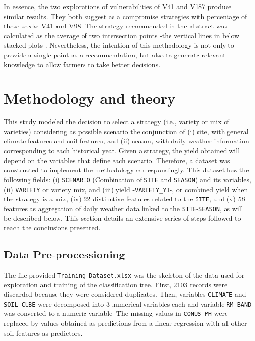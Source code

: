 \documentclass[syngen,nonblindrev]{informs3-syngen}
\begin{document}
In essence, the two explorations of vulnerabilities of V41 and V187 produce similar results. 
They both suggest as a compromise strategies with percentage of these seeds: V41 and V98. 
The strategy recommended in the abstract was calculated as the average of two intersection points -the vertical lines in below stacked plots-. 
Nevertheless, the intention of this methodology is not only to provide a single point as a recommendation, but also to generate relevant knowledge to allow farmers to take better decisions.

\section{Methodology and theory}

This study modeled the decision to select a strategy (i.e., variety or mix of varieties) considering as possible scenario the conjunction of (i) site, with general climate features and soil features, and (ii) season, with daily weather information corresponding to each historical year. 
Given a strategy, the yield obtained will depend on the variables that define each scenario. 
Therefore, a dataset was constructed to implement the methodology correspondingly.
This dataset has the following fields: (i) \texttt{SCENARIO} (Combination of \texttt{SITE} and \texttt{SEASON}) and its variables, (ii) \texttt{VARIETY} or variety mix, and (iii) yield -\texttt{VARIETY\_YI}-, or combined yield when the strategy is a mix, (iv) 22 distinctive features related to the \texttt{SITE}, and (v) 58 features as aggregation of daily weather data linked to the \texttt{SITE}-\texttt{SEASON}, as will be described below. 
This section details an extensive series of steps followed to reach the conclusions presented.

\subsection{Data Pre-processioning}

The file provided \texttt{Training Dataset.xlsx} was the skeleton of the data used for exploration and training of the classification tree. 
First, 2103 records were discarded because they were considered duplicates. 
Then, variables \texttt{CLIMATE} and \texttt{SOIL\_CUBE} were decomposed into 3 numerical variables each and variable \texttt{RM\_BAND} was converted to a numeric variable. 
The missing values in \texttt{CONUS\_PH} were replaced by values obtained as predictions from a linear regression with all other soil features as predictors. 
\end{document}
